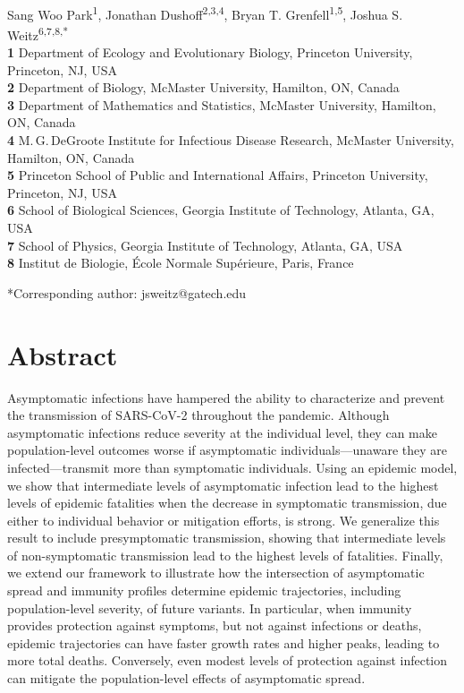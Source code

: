\documentclass[12pt]{article}
\date{\today}
\begin{document}
\begin{flushleft}{
	\Large
	\textbf{}
}
\newline
\\
Sang Woo Park\textsuperscript{1},
Jonathan Dushoff\textsuperscript{2,3,4},
Bryan T. Grenfell\textsuperscript{1,5},
Joshua S. Weitz\textsuperscript{6,7,8,*}
\\
\bigskip
\textbf{1} Department of Ecology and Evolutionary Biology, Princeton University, Princeton, NJ, USA
\\
\textbf{2} Department of Biology, McMaster University, Hamilton, ON, Canada
\\
\textbf{3} Department of Mathematics and Statistics, McMaster University, Hamilton, ON, Canada
\\
\textbf{4} M.\,G.\,DeGroote Institute for Infectious Disease Research, McMaster University, Hamilton, ON, Canada
\\
\textbf{5} Princeton School of Public and International Affairs, Princeton University, Princeton, NJ, USA
\\
\textbf{6} School of Biological Sciences, Georgia Institute of Technology, Atlanta, GA, USA
\\
\textbf{7} School of Physics, Georgia Institute of Technology, Atlanta, GA, USA
\\
\textbf{8} Institut de Biologie, \'{E}cole Normale Sup\'{e}rieure, Paris, France
\\
\bigskip

*Corresponding author: jsweitz@gatech.edu
\bigskip
\end{flushleft}

\section*{Abstract}

Asymptomatic infections have hampered the ability to characterize and prevent the transmission of SARS-CoV-2 throughout the pandemic.
Although asymptomatic infections reduce severity at the individual level, they can make population-level outcomes worse if asymptomatic individuals---unaware they are infected---transmit more than symptomatic individuals.
Using an epidemic model, we show that intermediate levels of asymptomatic infection lead to the highest levels of epidemic fatalities when the decrease in symptomatic transmission, due either to individual behavior or mitigation efforts, is strong. 
We generalize this result to include presymptomatic transmission, showing that intermediate levels of non-symptomatic transmission lead to the highest levels of fatalities.
Finally, we extend our framework to illustrate how the intersection of asymptomatic spread and immunity profiles determine epidemic trajectories, including population-level severity, of future variants.
In particular, when immunity provides protection against symptoms, but not against infections or deaths, epidemic trajectories can have faster growth rates and higher peaks, leading to more total deaths.
Conversely, even modest levels of protection against infection can mitigate the population-level effects of asymptomatic spread.
\end{document}
